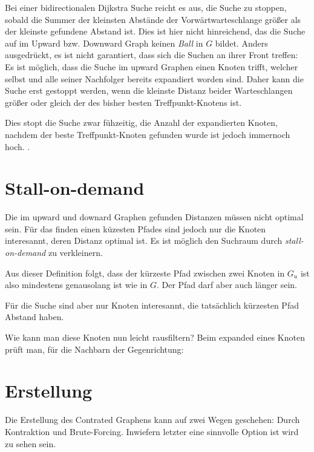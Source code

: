Bei einer bidirectionalen Dijkstra Suche reicht es aus, die Suche zu stoppen, sobald die Summer der kleinsten Abstände der Vorwärtwarteschlange größer als der kleinste gefundene Abstand ist.
Dies ist hier nicht hinreichend, das die Suche auf im Upward bzw. Downward Graph keinen \emph{Ball} in $G$ bildet.
Anders ausgedrückt, es ist nicht garantiert, dass sich die Suchen an ihrer Front treffen:
Es ist möglich, dass die Suche im upward Graphen einen Knoten trifft, welcher selbst und alle seiner Nachfolger bereits expandiert worden sind.
Daher kann die Suche erst gestoppt werden, wenn die kleinste Distanz beider Warteschlangen größer oder gleich der des bisher besten Treffpunkt-Knotens ist.

Dies stopt die Suche zwar fühzeitig, die Anzahl der expandierten Knoten, nachdem der beste Treffpunkt-Knoten gefunden wurde ist jedoch immernoch hoch.
.

\section{Stall-on-demand}

Die im upward und downard Graphen gefunden Distanzen müssen nicht optimal sein.
Für das finden einen küzesten Pfades sind jedoch nur die Knoten interesannt, deren Distanz optimal ist.
Es ist möglich den Suchraum durch \emph{stall-on-demand} zu verkleinern.


Aus dieser Definition folgt, dass der kürzeste Pfad zwischen zwei Knoten in $G_u$ ist also mindestens genausolang ist wie in $G$.
Der Pfad darf aber auch länger sein.


Für die Suche sind aber nur Knoten interesannt, die tatsächlich kürzesten Pfad Abstand haben.

Wie kann man diese Knoten nun leicht rausfiltern?
Beim expanded eines Knoten prüft man, für die Nachbarn der Gegenrichtung:


\section{Erstellung}

Die Erstellung des Contrated Graphens kann auf zwei Wegen geschehen: Durch Kontraktion und Brute-Forcing.
Inwiefern letzter eine sinnvolle Option ist wird  zu sehen sein.

